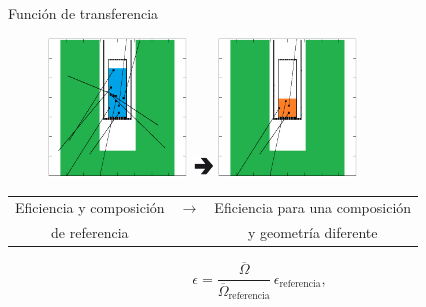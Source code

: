 \documentclass[9pt]{beamer}
\begin{document}
\begin{frame}{Función de transferencia}

\begin{figure}
\includegraphics[width=0.33\textwidth]{Imagenes/ZY-Paint.png}
\includegraphics[width=0.05\textwidth]{Imagenes/Flecha.jpg}
\includegraphics[width=0.33\textwidth]{Imagenes/ZY-Paint2.png}
\end{figure}
\begin{center}
\begin{tabular}{ccc}
Eficiencia y composición  & $\rightarrow$ & Eficiencia para una composición  \\
de referencia & & y geometría diferente 
\end{tabular}
\end{center}
			\begin{equation}
				\epsilon = \dfrac{\overline{\Omega}}{\overline{\Omega}_\text{referencia}}\,\epsilon_\text{referencia},
			\end{equation}
\end{frame}
\end{document}
